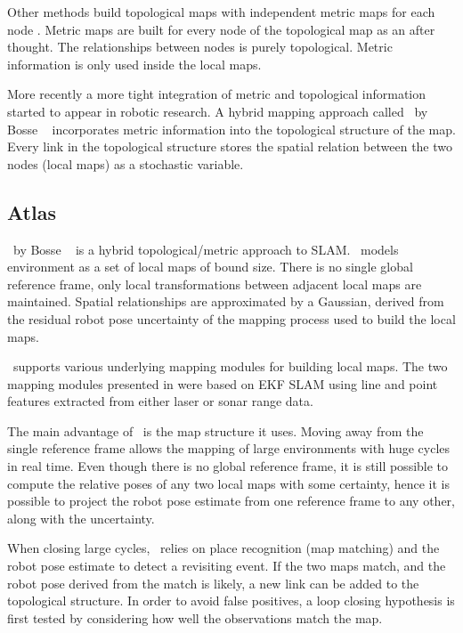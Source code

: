 Other methods build topological maps with independent metric maps for
each node \cite{Cho01,Kuipers00}. Metric maps are built for every node of the
topological map as an after thought. The relationships between nodes
is purely topological. Metric information is only used inside the
local maps.

More recently a more tight integration of metric and topological
information started to appear in robotic research. A hybrid mapping
approach called \Atlas\ by Bosse \etal\ \cite{bosse03atlas} incorporates
metric information into the topological structure of the map. Every
link in the topological structure stores the spatial relation between
the two nodes (local maps) as a stochastic variable. 



\subsection{Atlas}

\Atlas\ by Bosse \etal\ \cite{bosse03atlas} is a hybrid
topological/metric approach to SLAM. \Atlas\ models environment as a
set of local maps of bound size. There is no single global reference
frame, only local transformations between adjacent local maps are
maintained. Spatial relationships are approximated by a Gaussian,
derived from the residual robot pose uncertainty of the mapping
process used to build the local maps.

\Atlas\ supports various underlying mapping modules for building local
maps. The two mapping modules presented in \cite{bosse03atlas} were
based on EKF SLAM using line and point features extracted from either
laser or sonar range data.

The main advantage of \Atlas\ is the map structure it uses. Moving
away from the single reference frame allows the mapping of large
environments with huge cycles in real time. Even though there is no
global reference frame, it is still possible to compute the relative
poses of any two local maps with some certainty, hence it is possible
to project the robot pose estimate from one reference frame to any
other, along with the uncertainty.


When closing large cycles, \Atlas\ relies on place recognition
(map matching) and the robot pose estimate to detect a revisiting
event. If the two maps match, and the robot pose derived from the
match is likely, a new link can be added to the topological structure.
In order to avoid false positives, a loop closing hypothesis is first
tested by considering how well the observations match the map.


